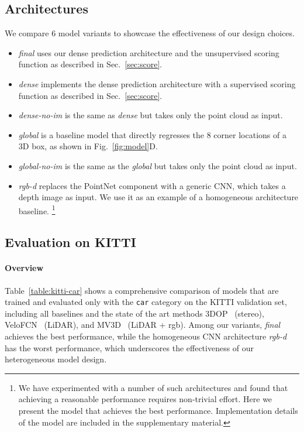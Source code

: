 \documentclass[10pt,twocolumn,letterpaper]{article}
\begin{document}
\subsection{Architectures}
We compare 6 model variants to showcase the effectiveness of our design choices.
\begin{itemize}[leftmargin=*]
    \setlength\itemsep{1pt}
    \item \textit{final} uses our dense prediction architecture and the unsupervised scoring function as described in Sec.~\ref{sec:score}.
    \item \textit{dense} implements the dense prediction architecture with a supervised scoring function as described in Sec.~\ref{sec:score}.
    \item \textit{dense-no-im} is the same as \textit{dense} but takes only the point cloud as input.
    \item \textit{global} is a baseline model that directly regresses the 8 corner locations of a 3D box, as shown in Fig.~\ref{fig:model}D.
    \item \textit{global-no-im} is the same as the \textit{global} but takes only the point cloud as input.
    \item \textit{rgb-d} replaces the PointNet component with a generic CNN, which takes a depth image as input. We use it as an example of a homogeneous architecture baseline. \footnote{We have experimented with a number of such architectures and found that achieving a reasonable performance requires  non-trivial effort. Here we present the model that achieves the best performance. Implementation details of the model are included in the supplementary material.}
\end{itemize}

\subsection{Evaluation on KITTI}
\paragraph{Overview} Table~\ref{table:kitti-car} shows a comprehensive comparison of models that are trained and evaluated only with the \texttt{car} category on the KITTI validation set, including all baselines and the state of the art methods 
3DOP~\cite{3dop} (stereo), VeloFCN~\cite{velofcn} (LiDAR), and MV3D~\cite{mv3d} (LiDAR + rgb).
Among our variants, \textit{final} achieves the best performance, while the homogeneous CNN architecture \textit{rgb-d} has the worst performance, which underscores the effectiveness of our heterogeneous model design. 
\end{document}
